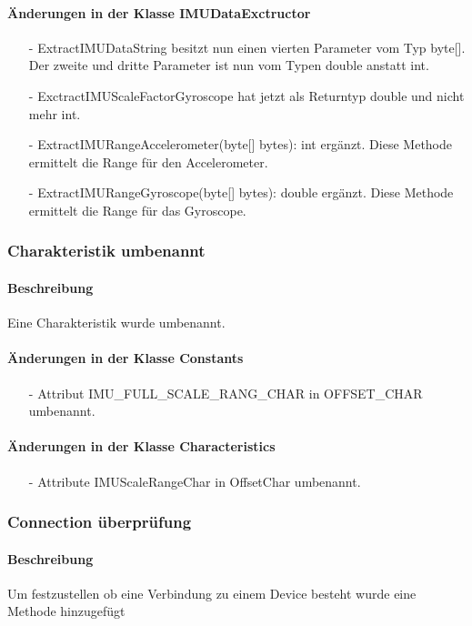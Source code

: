 \documentclass[a4paper,12pt]{article}
\begin{document}
\paragraph{Änderungen in der Klasse IMUDataExctructor}
\begin{itemize}
	 \item[-]  ExtractIMUDataString besitzt nun einen vierten Parameter vom Typ byte[]. Der zweite und dritte Parameter ist nun vom Typen double anstatt int.
	\item[-] ExctractIMUScaleFactorGyroscope hat jetzt als Returntyp double und nicht mehr int.
	\item[-] ExtractIMURangeAccelerometer(byte[] bytes): int ergänzt. Diese Methode ermittelt die Range für den Accelerometer.
	\item[-] ExtractIMURangeGyroscope(byte[] bytes): double ergänzt. Diese Methode ermittelt die Range für das Gyroscope.
\end{itemize}

\subsubsection{Charakteristik umbenannt}
\paragraph{Beschreibung}
Eine Charakteristik wurde umbenannt.
\paragraph{Änderungen in der Klasse Constants}
\begin{itemize}
	\item[-] Attribut IMU\_FULL\_SCALE\_RANG\_CHAR in OFFSET\_CHAR umbenannt.
\end{itemize}
\paragraph{Änderungen in der Klasse Characteristics}
\begin{itemize}
	\item[-] Attribute IMUScaleRangeChar in OffsetChar umbenannt.
\end{itemize}

\subsubsection{Connection überprüfung}
\paragraph{Beschreibung}
Um festzustellen ob eine Verbindung zu einem Device besteht wurde eine Methode hinzugefügt
\end{document}
